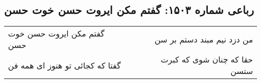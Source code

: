 \begin{center}
\section*{رباعی شماره ۱۵۰۳: گفتم مکن ایروت حسن خوت حسن}
\label{sec:1503}
\begin{longtable}{l p{0.5cm} r}
گفتم مکن ایروت حسن خوت حسن
&&
من دزد نیم مبند دستم بر سن
\\
گفتا که کجائی تو هنوز ای همه فن
&&
حقا که چنان شوی که کبرت ستسن
\\
\end{longtable}
\end{center}
